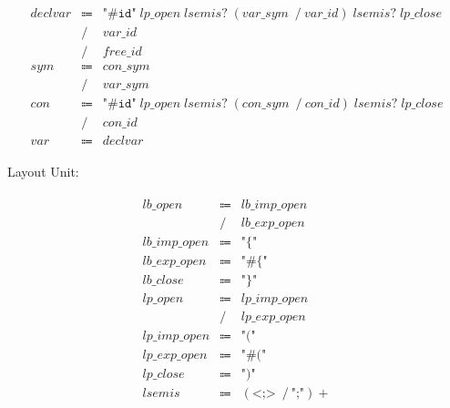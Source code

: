 \begin{align*}
    \begin{array}{rcll}
        \mathit{declvar}
        &\Coloneq &\texttt{"\#id"}\; \mathit{lp\_open}\; \mathit{lsemis}{?}\; (\mathit{var\_sym}\; \mathrel{/} \mathit{var\_id})\; \mathit{lsemis}{?}\; \mathit{lp\_close} \\
        &\mathrel{/} &\mathit{var\_id} \\
        &\mathrel{/} &\mathit{free\_id} \\
        \mathit{sym}
        &\Coloneq &\mathit{con\_sym} \\
        &\mathrel{/} &\mathit{var\_sym} \\
        \mathit{con}
        &\Coloneq &\texttt{"\#id"}\; \mathit{lp\_open}\; \mathit{lsemis}{?}\; (\mathit{con\_sym}\; \mathrel{/} \mathit{con\_id})\; \mathit{lsemis}{?}\; \mathit{lp\_close} \\
        &\mathrel{/} &\mathit{con\_id} \\
        \mathit{var}
        &\Coloneq &\mathit{declvar}
    \end{array}
\end{align*}

Layout Unit:

\begin{align*}
    \begin{array}{rcll}
        \mathit{lb\_open}
        &\Coloneq &\mathit{lb\_imp\_open} \\
        &\mathrel{/} &\mathit{lb\_exp\_open} \\
        \mathit{lb\_imp\_open}
        &\Coloneq &\texttt{"\{"} \\
        \mathit{lb\_exp\_open}
        &\Coloneq &\texttt{"\#\{"} \\
        \mathit{lb\_close}
        &\Coloneq &\texttt{"\}"} \\
        \mathit{lp\_open}
        &\Coloneq &\mathit{lp\_imp\_open} \\
        &\mathrel{/} &\mathit{lp\_exp\_open} \\
        \mathit{lp\_imp\_open}
        &\Coloneq &\texttt{"("} \\
        \mathit{lp\_exp\_open}
        &\Coloneq &\texttt{"\#("} \\
        \mathit{lp\_close}
        &\Coloneq &\texttt{")"} \\
        \mathit{lsemis}
        &\Coloneq &(\texttt{<;>}\; \mathrel{/} \texttt{";"}){+}
    \end{array}
\end{align*}

